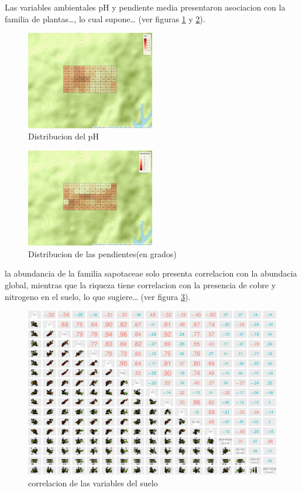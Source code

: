 \documentclass[11pt,]{article}
\begin{document}
Las variables ambientales pH y pendiente media presentaron asociacion
con la familia de plantas\ldots{}, lo cual supone\ldots{} (ver figuras
\ref{fig:mapa_cuadros_pH} y \ref{fig:mapa_cuadros_pendiente}).

\begin{figure}
\centering
\includegraphics[width=0.50000\textwidth]{mapa_cuadros_ph.png}
\caption{Distribucion del pH\label{fig:mapa_cuadros_pH}}
\end{figure}

\begin{figure}
\centering
\includegraphics[width=0.50000\textwidth]{mapa_cuadros_pendiente.png}
\caption{Distribucion de las pendientes(en
grados)\label{fig:mapa_cuadros_pendiente}}
\end{figure}

la abundancia de la familia sapotaceae solo presenta correlacion con la
abundacia global, mientras que la riqueza tiene correlacion con la
presencia de cobre y nitrogeno en el suelo, lo que sugiere\ldots{} (ver
figura \ref{fig:p_cor_suelo_ar}).

\begin{figure}
\centering
\includegraphics{manuscrito_files/figure-latex/unnamed-chunk-5-1.pdf}
\caption{\label{fig:p_cor_suelo_ar}correlacion de las variables del
suelo}
\end{figure}
\end{document}
